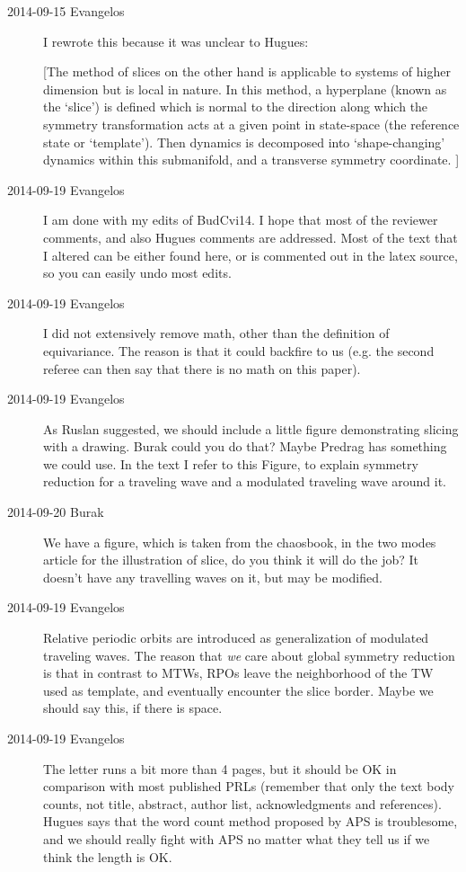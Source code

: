 \begin{description}
\item[2014-09-15 Evangelos] I rewrote this because it was unclear to Hugues:

[The method of slices
on the other hand is applicable to systems of higher dimension
but is local in nature.
In this method, a hyperplane (known as the `slice')
is defined which is normal to the direction along which the symmetry transformation
acts at a given point in state-space (the reference state or `template').
Then dynamics is decomposed into `shape-changing' dynamics within this
submanifold, and a transverse symmetry coordinate.
]

\item[2014-09-19 Evangelos] I am done with my edits of BudCvi14. I hope that most of the reviewer comments,
and also Hugues comments are addressed. Most of the text that I altered can be either found here, or
is commented out in the latex source, so you can easily undo most edits.

\item[2014-09-19 Evangelos] I did not extensively remove math, other than the definition of equivariance.
The reason is that it could backfire to us (e.g. the second referee can then say that there is no math on this
paper).

\item[2014-09-19 Evangelos] As Ruslan suggested, we should include a little figure demonstrating slicing with a drawing.
Burak could you do that? Maybe Predrag has something we could use. In the text I refer to this Figure,
to explain symmetry reduction for a traveling wave and a modulated traveling wave around it.

\item[2014-09-20 Burak] We have a figure, which is taken from the chaosbook, in the two modes article
for the illustration of slice, do you think it will do the job? It doesn't have any travelling waves
on it, but may be modified.

\item[2014-09-19 Evangelos] Relative periodic orbits are introduced as generalization of modulated traveling waves.
The reason that \emph{we} care about global symmetry reduction is that in contrast to MTWs, RPOs leave the neighborhood of the
TW used as template, and eventually encounter the slice border. Maybe we should say this, if there is space.

\item[2014-09-19 Evangelos] The letter runs a bit more than 4 pages, but it should be OK in comparison with most published PRLs
(remember that only the text body counts, not title, abstract, author list, acknowledgments and references).
Hugues says that the word count method proposed by APS is troublesome, and we should really fight with APS no matter what they
tell us if we think the length is OK.


\end{description}
